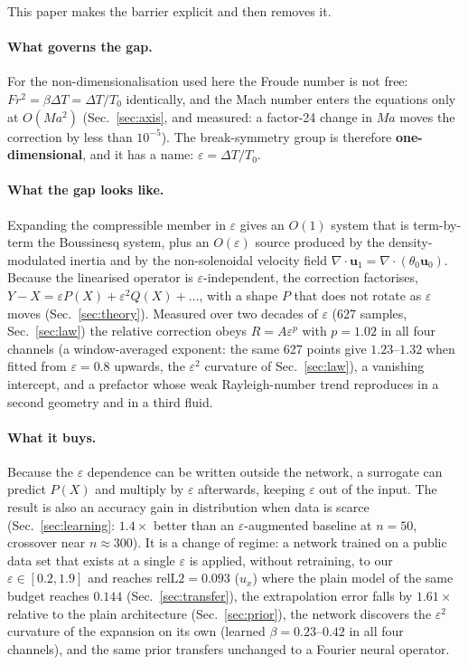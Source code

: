 \documentclass[11pt,a4paper]{article}
\begin{document}
This paper makes the barrier explicit and then removes it.

\paragraph{What governs the gap.} For the non-dimensionalisation used here the Froude number is not
free: $Fr^2=\beta\Delta T=\Delta T/T_0$ identically, and the Mach number enters the equations only
at $O(Ma^2)$ (Sec.~\ref{sec:axis}, and measured: a factor-24 change in $Ma$ moves the correction by
less than $10^{-5}$). The break-symmetry group is therefore \textbf{one-dimensional}, and it has a
name: $\varepsilon=\Delta T/T_0$.

\paragraph{What the gap looks like.} Expanding the compressible member in $\varepsilon$ gives an
$O(1)$ system that is term-by-term the Boussinesq system, plus an $O(\varepsilon)$ source produced
by the density-modulated inertia and by the non-solenoidal velocity field
$\nabla\cdot\bm{u}_1=\nabla\cdot(\theta_0\bm{u}_0)$. Because the linearised operator is
$\varepsilon$-independent, the correction factorises,
$Y-X=\varepsilon P(X)+\varepsilon^2Q(X)+\dots$, with a shape $P$ that does not rotate as
$\varepsilon$ moves (Sec.~\ref{sec:theory}). Measured over two decades of $\varepsilon$ (627
samples, Sec.~\ref{sec:law}) the relative correction obeys $R=A\varepsilon^p$ with $p=1.02$ in all
four channels (a window-averaged exponent: the same 627 points give $1.23$--$1.32$ when fitted from
$\varepsilon=0.8$ upwards, the $\varepsilon^2$ curvature of Sec.~\ref{sec:law}), a vanishing
intercept, and a prefactor whose weak Rayleigh-number trend reproduces in a second geometry and in
a third fluid.

\paragraph{What it buys.} Because the $\varepsilon$ dependence can be written outside the network, a
surrogate can predict $P(X)$ and multiply by $\varepsilon$ afterwards, keeping $\varepsilon$ out of
the input. The result is also an accuracy gain in distribution when data is scarce
(Sec.~\ref{sec:learning}: $1.4\times$ better than an $\varepsilon$-augmented baseline at $n=50$,
crossover near $n\approx300$). It is a change of regime: a network trained on a public data set
that exists at a single $\varepsilon$ is applied, without retraining, to our
$\varepsilon\in[0.2,1.9]$ and reaches $\mathrm{relL2}=0.093$ ($u_x$) where the plain model of the
same budget reaches $0.144$ (Sec.~\ref{sec:transfer}), the extrapolation error falls by $1.61\times$
relative to the plain architecture (Sec.~\ref{sec:prior}), the network discovers the
$\varepsilon^2$ curvature of the expansion on its own (learned $\beta=0.23$--$0.42$ in all four
channels), and the same prior transfers unchanged to a Fourier neural operator.
\end{document}
